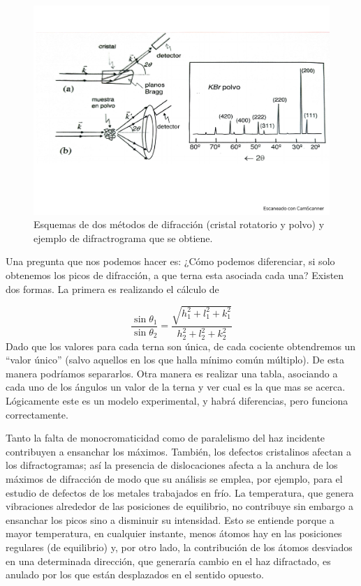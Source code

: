     
\begin{figure}[h!] \centering
    \includegraphics[scale=0.35]{Cuerpo/Ch_02/Fotos_libro 8.pdf}
    \caption{Esquemas de dos métodos de difracción (cristal rotatorio y polvo) y ejemplo de difractrograma que se obtiene.}
    \label{Fig:02-08}
\end{figure}

Una pregunta que nos podemos hacer es: ¿Cómo podemos diferenciar, si solo obtenemos los picos de difracción, a que terna esta asociada cada una? Existen dos formas. La primera es realizando el cálculo de 

\begin{equation}
    \frac{\sin \theta_1}{\sin \theta_2} = \frac{\sqrt{h_1^2+l_1^2+k_1^2}}{h_2^2+l_2^2+k_2^2}
\end{equation}
Dado que los valores para cada terna son única, de cada cociente obtendremos un ``valor único'' (salvo aquellos en los que halla mínimo común múltiplo). De esta manera podríamos separarlos. Otra manera es realizar una tabla, asociando a cada uno de los ángulos un valor de la terna y ver cual es la que mas se acerca. Lógicamente este es un modelo experimental, y habrá diferencias, pero funciona correctamente. 

Tanto la falta de monocromaticidad como de paralelismo del haz incidente contribuyen a ensanchar los máximos. También, los defectos cristalinos afectan a los difractogramas; así la presencia de dislocaciones afecta a la anchura de los máximos de difracción de modo que su análisis se emplea, por ejemplo, para el estudio de defectos de los metales trabajados en frío. La temperatura, que genera vibraciones alrededor de las posiciones de equilibrio, no contribuye sin embargo a ensanchar los picos sino a disminuir su intensidad. Esto se entiende porque a mayor temperatura, en cualquier instante, menos átomos hay en las posiciones regulares (de equilibrio) y, por otro lado, la contribución de los átomos desviados en una determinada dirección, que generaría cambio en el haz difractado, es anulado por los que están desplazados en el sentido opuesto. 
    
